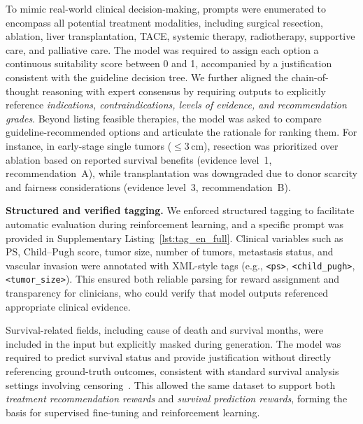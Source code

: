 \documentclass{article}
\begin{document}
To mimic real-world clinical decision-making, prompts were enumerated to encompass all potential treatment modalities, including surgical resection, ablation, liver transplantation, TACE, systemic therapy, radiotherapy, supportive care, and palliative care. The model was required to assign each option a continuous suitability score between 0 and 1, accompanied by a justification consistent with the guideline decision tree. We further aligned the chain-of-thought reasoning with expert consensus by requiring outputs to explicitly reference \emph{indications, contraindications, levels of evidence, and recommendation grades}. Beyond listing feasible therapies, the model was asked to compare guideline-recommended options and articulate the rationale for ranking them. For instance, in early-stage single tumors ($\leq$3\,cm), resection was prioritized over ablation based on reported survival benefits (evidence level~1, recommendation~A), while transplantation was downgraded due to donor scarcity and fairness considerations (evidence level~3, recommendation~B).

\textbf{Structured and verified tagging.}
We enforced structured tagging to facilitate automatic evaluation during reinforcement learning, and a specific prompt was provided in {Supplementary Listing~\ref{lst:tag_en_full}}. Clinical variables such as PS, Child--Pugh score, tumor size, number of tumors, metastasis status, and vascular invasion were annotated with XML-style tags (e.g., \texttt{<ps>}, \texttt{<child\_pugh>}, \texttt{<tumor\_size>}). This ensured both reliable parsing for reward assignment and transparency for clinicians, who could verify that model outputs referenced appropriate clinical evidence. 

Survival-related fields, including cause of death and survival months, were included in the input but explicitly masked during generation. The model was required to predict survival status and provide justification without directly referencing ground-truth outcomes, consistent with standard survival analysis settings involving censoring~\cite{kaplan_meier_1958,cox1972}. This allowed the same dataset to support both \textit{treatment recommendation rewards} and \textit{survival prediction rewards}, forming the basis for supervised fine-tuning and reinforcement learning.
\end{document}
